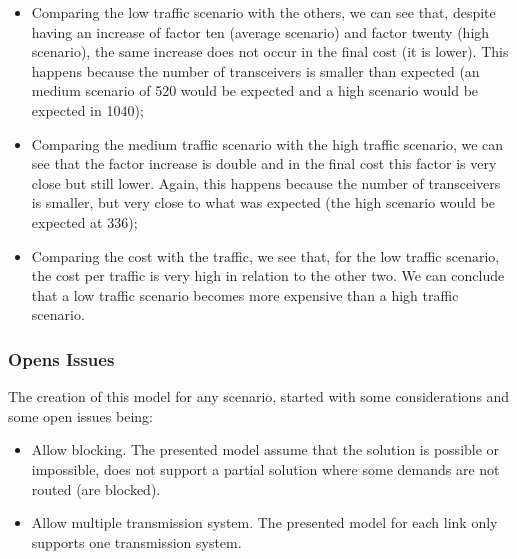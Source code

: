 \begin{itemize}
    \item Comparing the low traffic scenario with the others, we can see that, despite having an increase of factor ten (average scenario) and factor twenty (high scenario), the same increase does not occur in the final cost (it is lower). This happens because the number of transceivers is smaller than expected (an medium scenario of 520 would be expected and a high scenario would be expected in 1040);
    \item Comparing the medium traffic scenario with the high traffic scenario, we can see that the factor increase is double and in the final cost this factor is very close but still lower. Again, this happens because the number of transceivers is smaller, but very close to what was expected (the high scenario would be expected at 336);
    \item Comparing the cost with the traffic, we see that, for the low traffic scenario, the cost per traffic is very high in relation to the other two. We can conclude that a low traffic scenario becomes more expensive than a high traffic scenario.
\end{itemize}


\vspace{13pt}
\subsubsection{Opens Issues}

The creation of this model for any scenario, started with some considerations and some open issues being:

\begin{itemize}
  \item Allow blocking.
  \subitem The presented model assume that the solution is possible or impossible, does not support a partial solution where some demands are not routed (are blocked).
  \item Allow multiple transmission system.
  \subitem The presented model for each link only supports one transmission system.
\end{itemize}

